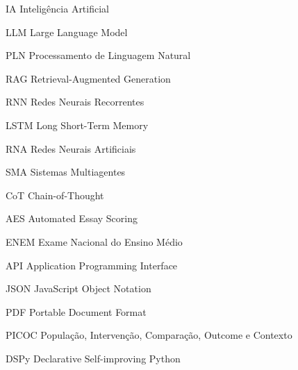 \begin{siglas}
  \item[IA] Inteligência Artificial
  \item[LLM] Large Language Model
  \item[PLN] Processamento de Linguagem Natural
  \item[RAG] Retrieval-Augmented Generation
  \item[RNN] Redes Neurais Recorrentes
  \item[LSTM] Long Short-Term Memory
  \item[RNA] Redes Neurais Artificiais
  \item[SMA] Sistemas Multiagentes
  \item[CoT] Chain-of-Thought
  \item[AES] Automated Essay Scoring
  \item[ENEM] Exame Nacional do Ensino Médio
  \item[API] Application Programming Interface
  \item[JSON] JavaScript Object Notation
  \item[PDF] Portable Document Format
  \item[PICOC] População, Intervenção, Comparação, Outcome e Contexto
  \item[DSPy] Declarative Self-improving Python
\end{siglas}

\clearpage
